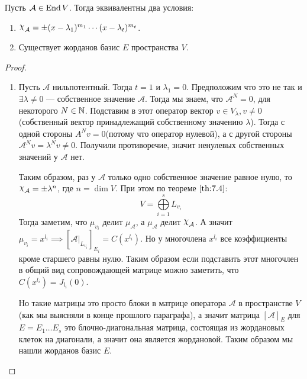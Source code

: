 \documentclass[../main.tex]{subfiles}
\begin{document}
\begin{theorem}
  Пусть $\mathcal{A} \in \operatorname{End} V$. Тогда эквивалентны два условия:
  \begin{enumerate}
    \item $\rchi_{\mathcal{A}} = \pm (x - \lambda_1)^{m_1} \dotsm (x - \lambda_t)^{m_t}$.
    \item Существует жорданов базис $E$ пространства $V$.
  \end{enumerate}
\end{theorem}
\begin{proof}
  \begin{enumerate}
    \item Пусть $\mathcal{A}$ нильпотентный. Тогда $t = 1$ и $\lambda_1 = 0$. Предположим что это не так и $\exists \lambda \neq 0$ --- собственное значение $\mathcal{A}$. Тогда мы знаем, что $\mathcal{A}^N = 0$, для некоторого $N \in \mathbb{N}$. Подставим в этот оператор вектор $v \in V_{\lambda}, v \neq 0$(собственный вектор принадлежащий собственному значению $\lambda$). Тогда с одной стороны $A^N v = 0$(потому что оператор нулевой), а с другой стороны $\mathcal{A}^N v = \lambda^N v \neq 0$. Получили противоречие, значит ненулевых собственных значений у $\mathcal{A}$ нет.

    Таким образом, раз у $\mathcal{A}$ только одно собственное значение равное нулю, то $\rchi_{\mathcal{A}} = \pm \lambda^n$, где $n = \dim V$. При этом по теореме $\ref{th:7.4}$:
    \begin{equation*}
      V = \bigoplus\limits_{i = 1}^{s} L_{v_i}
    \end{equation*}
    Тогда заметим, что $\mu_{v_i}$ делит $\mu_{\mathcal{A}}$, а $\mu_{\mathcal{A}}$ делит $\rchi_{\mathcal{A}}$. А значит $\mu_{v_i} = x^{l_i} \implies [\mathcal{A} |_{L_{v_i}}]_{E_i} = C(x^{l_i})$. Но у многочлена $x^{l_i}$ все коэффициенты кроме старшего равны нулю. Таким образом если подставить этот многочлен в общий вид сопровождающей матрице можно заметить, что $C(x^{l_i}) = J_{l_i}(0)$.

    Но такие матрицы это просто блоки в матрице оператора $\mathcal{A}$ в пространстве $V$(как мы выясняли в конце прошлого параграфа), а значит матрица $[\mathcal{A}]_E$ для $E = E_1 \dotso E_s$ это блочно-диагональная матрица, состоящая из жордановых клеток на диагонали, а значит она является жордановой. Таким образом мы нашли жорданов базис $E$.


\end{enumerate}
\end{proof}
\end{document}
